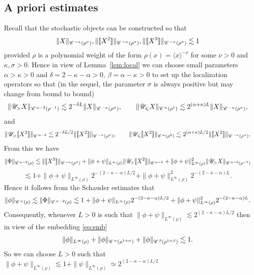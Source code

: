 \documentclass[a4paper,11pt]{article}
\numberwithin{equation}{section}
\newcommand{\CC}{\mathscr{C} \hspace{.1em}}
\newcommand{\UU}{\mathscr{U}}
\newcommand{\8}{\infty}
\begin{document}
\subsection{A priori estimates}
\label{ssec:apr}
 
 
Recall that the stochastic objects can be constructed so that
$$
\|X\|_{\CC^{-\kappa}(\rho^\sigma)},\|\llbracket X^2 \rrbracket\|_{\CC^{-\kappa}(\rho^\sigma)},\|\llbracket X^3 \rrbracket\|_{\CC^{-\kappa}(\rho^\sigma)}\lesssim 1
$$
provided $\rho$ is a polynomial weight of the form $\rho(x)=\langle x\rangle^{-\nu}$ for some $\nu>0$ and $\kappa,\sigma>0$. 
Hence in view of Lemma~\ref{lem:local} we can choose small parameters $\alpha>\kappa>0$ and $\delta=2-\kappa-\alpha>0$, $\beta=\alpha-\kappa>0$ to set up the localization operators so that (in the sequel, the parameter $\sigma$ is always positive but may change from bound to bound)
$$
\| \UU_{>} X \|_{\CC^{\alpha-2} (\rho^{- 1})} \lesssim 2^{- \delta L}\|X\|_{\CC^{-\kappa}(\rho^\sigma)},
   \qquad \| \UU_{\leqslant} X \|_{\CC^{\alpha} (\rho^{1})}
   \lesssim 2^{(\alpha+\kappa) L}\|X\|_{\CC^{-\kappa}(\rho^\sigma)},
$$
and
\[ \| \UU_{>} \llbracket X^2 \rrbracket \|_{\CC^{\alpha-2}} \lesssim
   2^{- \delta L/2}\|\llbracket X^2 \rrbracket\|_{\CC^{-\kappa}(\rho^\sigma)}, \qquad \| \UU_{\leqslant} \llbracket X^2 \rrbracket
   \|_{\CC^{\alpha} (\rho^{2 })} \lesssim 2^{(\alpha+\kappa) L/2}\|\llbracket X^2 \rrbracket\|_{\CC^{-\kappa}(\rho^\sigma)}. \]
From this we have
$$
\| \Phi \|_{\CC^{\alpha - 2} (\rho)} \lesssim \|\llbracket X^3 \rrbracket\|_{\CC^{-\kappa}(\rho^\sigma)} + \|\phi+\psi\|_{L^\infty(\rho)}\| \UU_{>} \llbracket X^2 \rrbracket \|_{\CC^{\alpha - 2}}+\|\phi+\psi\|_{L^\infty(\rho)}^2\| \UU_{>} X \|_{\CC^{\alpha - 2} (\rho^{- 1})}
$$
$$
\lesssim 1+ \|\phi+\psi\|_{L^\infty(\rho)} 2^{-(2-\kappa-\alpha)L/2}+\|\phi+\psi\|_{L^\infty(\rho)}^2 2^{-(2-\kappa-\alpha)L}.
$$
Hence it follows from the Schauder estimates that
\begin{equation}\label{eq:44e}
\|\phi\|_{\CC^\alpha(\rho)}\lesssim \| \Phi \|_{\CC^{\alpha - 2} (\rho)} \lesssim 1+  \|\phi+\psi\|_{L^\infty(\rho)} 2^{-(2-\kappa-\alpha)L/2}+\|\phi+\psi\|_{L^\infty(\rho)}^2 2^{-(2-\kappa-\alpha)L}.
\end{equation}
Consequently, whenever $L>0$ is such that $\|\phi+\psi\|_{L^\infty(\rho)}\lesssim 2^{(2-\kappa-\alpha)L/2}$ then in view of the embedding \eqref{eq:emb}
\[ \| \phi \|_{L^{\infty} (\rho)} + \| \phi \|_{\CC^{\alpha} (\rho^{1 +
   \alpha})}+ \| \phi \|_{\CC^{\beta} (\rho^{1 +
   \beta})} \lesssim 1. \]
So we can choose $L>0$ such that $\|\phi+\psi\|_{L^\infty(\rho)}\lesssim 1+\|\psi\|_{L^\infty(\rho)}\simeq 2^{(2-\kappa-\alpha)L/2}$
\end{document}
